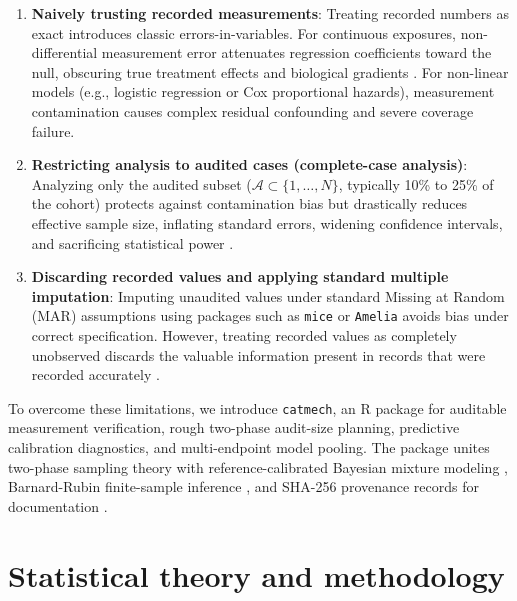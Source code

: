 \documentclass[
]{article}
\providecommand{\tightlist}{%
  \setlength{\itemsep}{0pt}\setlength{\parskip}{0pt}}
\begin{document}
\begin{enumerate}
\def\labelenumi{\arabic{enumi}.}
\tightlist
\item
  \textbf{Naively trusting recorded measurements}: Treating recorded
  numbers as exact introduces classic errors-in-variables. For
  continuous exposures, non-differential measurement error attenuates
  regression coefficients toward the null, obscuring true treatment
  effects and biological gradients \citep{carroll2006measurement}. For
  non-linear models (e.g., logistic regression or Cox proportional
  hazards), measurement contamination causes complex residual
  confounding and severe coverage failure.
\item
  \textbf{Restricting analysis to audited cases (complete-case
  analysis)}: Analyzing only the audited subset
  (\(\mathcal{A} \subset \{1, \dots, N\}\), typically 10\% to 25\% of
  the cohort) protects against contamination bias but drastically
  reduces effective sample size, inflating standard errors, widening
  confidence intervals, and sacrificing statistical power
  \citep{neyman1938contribution, breslow2003semiparametric}.
\item
  \textbf{Discarding recorded values and applying standard multiple
  imputation}: Imputing unaudited values under standard Missing at
  Random (MAR) assumptions using packages such as \texttt{mice}
  \citep{vanbuuren2011mice, white2011multiple} or \texttt{Amelia}
  \citep{honaker2011amelia} avoids bias under correct specification.
  However, treating recorded values as completely unobserved discards
  the valuable information present in records that were recorded
  accurately \citep{rubin1996multiple}.
\end{enumerate}

To overcome these limitations, we introduce \texttt{catmech}, an R
package for auditable measurement verification, rough two-phase
audit-size planning, predictive calibration diagnostics, and
multi-endpoint model pooling. The package unites two-phase sampling
theory
\citep{cochran1977sampling, breslow2003semiparametric, robins1994estimation}
with reference-calibrated Bayesian mixture modeling
\citep{huang2013simple}, Barnard-Rubin finite-sample inference
\citep{barnard1999small}, and SHA-256 provenance records for
documentation \citep{fda2003part11}.

\section{Statistical theory and
methodology}\label{statistical-theory-and-methodology}
\end{document}
